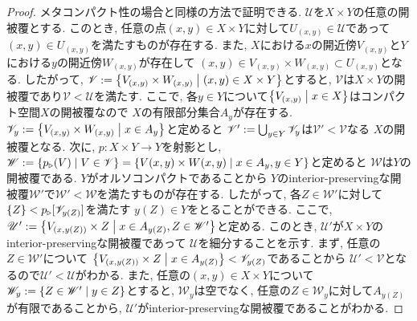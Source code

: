 \documentclass[uplatex, dvipdfmx, a4paper, 12pt, class=jsbook, crop=false]{standalone}
\begin{document}
\begin{proof}
	メタコンパクト性の場合と同様の方法で証明できる. $ \mathscr{U} $を$ X \times Y $の任意の開被覆とする. 
	このとき, 任意の点$ (x, y) \in X \times Y $に対して$ U_{(x, y)} \in \mathscr{U} $であって
	$ (x, y) \in U_{(x, y)} $を満たすものが存在する. 
	また, $ X $における$ x $の開近傍$ V_{(x, y)} $と$ Y $における$ y $の開近傍$ W_{(x, y)} $が存在して
	$ (x, y) \in V_{(x,y)} \times W_{(x, y)} \subset U_{(x, y)} $となる. 
	したがって, $ \mathscr{V} \defeq \setcomp{V_{(x, y)} \times W_{(x, y)}}{(x, y) \in X \times Y} $とすると, 
	$ \mathscr{V} $は$ X \times Y $の開被覆であり$ \mathscr{V} < \mathscr{U} $を満たす. 
	ここで, 各$ y \in Y $について$ \setcomp{V_{(x, y)}}{x \in X} $はコンパクト空間$ X $の開被覆なので
	$ X $の有限部分集合$ A_y $が存在する. 
	$ \mathscr{V}_y \defeq \setcomp{V_{(x, y)} \times W_{(x, y)}}{x \in A_y} $と定めると
	$ \mathscr{V}' \mathrel{:=} \bigcup_{y \in Y}\mathscr{V}_y $は$ \mathscr{V}' < \mathscr{V} $なる
	$ X $の開被覆となる. 次に, $ p \colon X \times Y \to Y $を射影とし, 
	$ \mathscr{W} \defeq \setcomp{p_{\imgto}(V)}{V \in \mathscr{V}} = \setcomp{V(x, y) \times W(x, y)}{x \in A_y, y \in Y} $と定めると
	$ \mathscr{W} $は$ Y $の開被覆である. $ Y $がオルソコンパクトであることから
	$ Y $のinterior-preservingな開被覆$ \mathscr{W}' $で$ \mathscr{W}' < \mathscr{W} $を満たすものが存在する. 
	したがって, 各$ Z \in \mathscr{W}' $に対して$ \{Z\} <  p_{{}\triangleright{}}[\mathscr{V}_{y(Z)}] $を満たす
	$ y(Z) \in Y $をとることができる. 
	ここで, $ \mathscr{U}' \defeq  \setcomp{V_{(x, y(Z))} \times Z}{x \in A_{y(Z)}, Z \in \mathscr{W}'} $と定める. 
	このとき, $ \mathscr{U}' $が$ X \times Y $のinterior-preservingな開被覆であって
	$ \mathscr{U} $を細分することを示す. まず, 任意の$ Z \in \mathscr{W}' $について
	$ \setcomp{V_{(x, y(Z))} \times Z}{x \in A_{y(Z)}} < \mathscr{V}_{y(Z)} $であることから
	$ \mathscr{U}' < \mathscr{V} $となるので$ \mathscr{U}' < \mathscr{U} $がわかる. 
	また, 任意の$ (x, y) \in X \times Y $について
	$ \mathscr{W}_y \defeq \setcomp{Z \in \mathscr{W}'}{y \in Z} $とすると, $ \mathscr{W}_y $は空でなく, 
	任意の$ Z \in \mathscr{W}_y $に対して$ A_{y(Z)} $が有限であることから, 
	$ \mathscr{U}' $がinterior-preservingな開被覆であることがわかる.
\end{proof}
\end{document}
